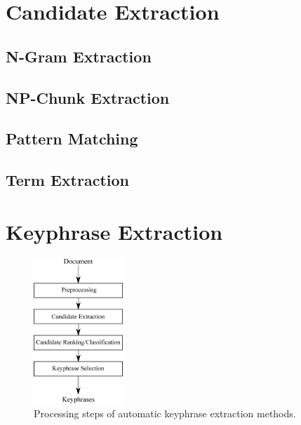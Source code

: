 
\section{Candidate Extraction}
\label{sec:candidate_extraction}

  \subsection{N-Gram Extraction}
  \label{subsec:n_gram_extraction}
  \subsection{NP-Chunk Extraction}
  \label{subsec:np_chunk_extraction}
  \subsection{Pattern Matching}
  \label{subsec:pattern_matching}
  \subsection{Term Extraction}
  \label{subsec:term_extraction}

\section{Keyphrase Extraction}
\label{sec:keyphrase_extraction}
  \begin{figure}
    \centering
    \includegraphics[width=0.3\textwidth]{include/processing_steps.eps}
    \caption{Processing steps of automatic keyphrase extraction methods.
             \label{fig:processing_steps}}
  \end{figure}

